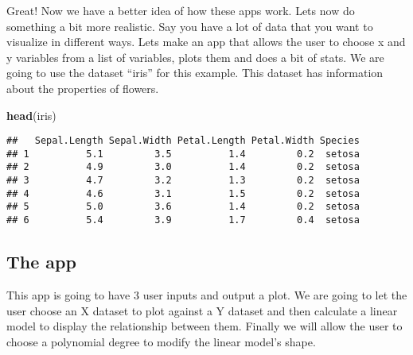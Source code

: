 \documentclass[]{article}
\newenvironment{Shaded}{\begin{snugshade}}{\end{snugshade}}
\newcommand{\KeywordTok}[1]{\textcolor[rgb]{0.13,0.29,0.53}{\textbf{#1}}}
\newcommand{\NormalTok}[1]{#1}
\begin{document}
Great! Now we have a better idea of how these apps work. Lets now do
something a bit more realistic. Say you have a lot of data that you want
to visualize in different ways. Lets make an app that allows the user to
choose x and y variables from a list of variables, plots them and does a
bit of stats. We are going to use the dataset ``iris'' for this example.
This dataset has information about the properties of flowers.

\begin{Shaded}
\begin{Highlighting}[]
\KeywordTok{head}\NormalTok{(iris)}
\end{Highlighting}
\end{Shaded}

\begin{verbatim}
##   Sepal.Length Sepal.Width Petal.Length Petal.Width Species
## 1          5.1         3.5          1.4         0.2  setosa
## 2          4.9         3.0          1.4         0.2  setosa
## 3          4.7         3.2          1.3         0.2  setosa
## 4          4.6         3.1          1.5         0.2  setosa
## 5          5.0         3.6          1.4         0.2  setosa
## 6          5.4         3.9          1.7         0.4  setosa
\end{verbatim}

\hypertarget{the-app}{%
\subsection{The app}\label{the-app}}

This app is going to have 3 user inputs and output a plot. We are going
to let the user choose an X dataset to plot against a Y dataset and then
calculate a linear model to display the relationship between them.
Finally we will allow the user to choose a polynomial degree to modify
the linear model's shape.
\end{document}
